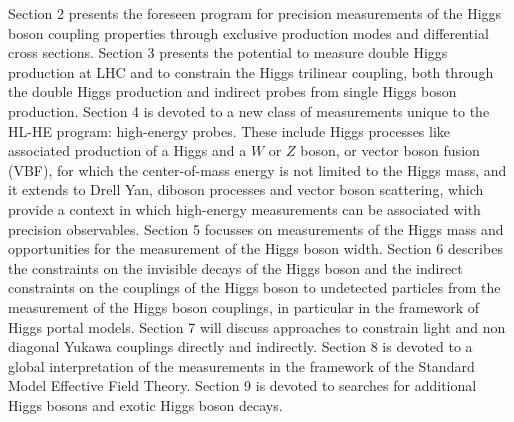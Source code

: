 \documentclass[../report.tex]{subfiles}
\begin{document}
Section 2 presents the foreseen program for precision measurements of
the Higgs boson coupling properties through exclusive production modes
and differential cross sections. Section 3 presents the potential to
measure double Higgs production at LHC and to constrain the Higgs
trilinear coupling, both through the double Higgs production and
indirect probes from single Higgs boson production. Section 4 is
devoted to a new class of measurements unique to the HL-HE program:
high-energy probes. These include Higgs processes like  associated production  of a Higgs and a $W$ or $Z$ boson,  or vector boson fusion (VBF), for which the center-of-mass energy is not limited to the Higgs mass, and it extends to
Drell Yan, diboson processes and vector
boson scattering, which provide a context in which high-energy measurements can be associated with 
 precision observables. Section 5 focusses on measurements of the
Higgs mass and opportunities for the measurement of the Higgs boson
width. Section 6 describes the constraints on the invisible decays of
the Higgs boson and the indirect constraints on the couplings of the
Higgs boson to undetected particles from the measurement of the Higgs
boson couplings, in particular in the framework of Higgs portal
models. Section 7 will discuss approaches to constrain light and non
diagonal Yukawa couplings directly and indirectly. Section 8 is
devoted to a global interpretation of the measurements in the
framework of the Standard Model Effective Field Theory. Section 9 is
devoted to searches for additional Higgs bosons and exotic Higgs boson
decays.




\end{document}
